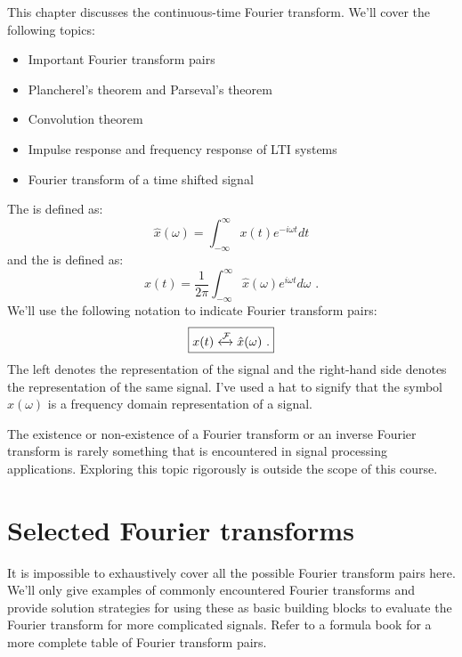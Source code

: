 This chapter discusses the continuous-time Fourier transform. We'll cover the following topics:
\begin{itemize}
    \item Important Fourier transform pairs
    \item Plancherel's theorem and Parseval's theorem
    \item Convolution theorem
    \item Impulse response and frequency response of LTI systems
    \item Fourier transform of a time shifted signal
\end{itemize}

\noindent The \emph{} is defined as:
\begin{equation}
    \boxed{
        \hat{x}(\omega) = \int_{-\infty}^{\infty} x(t) e^{-i\omega t}dt}
\end{equation}
and the \emph{} is defined as:
\begin{equation}
    \boxed{
        x(t) = \frac{1}{2\pi}\int_{-\infty}^{\infty} \hat{x}(\omega) e^{i\omega t}d\omega\,\,.
    }
\end{equation}
We'll use the following notation to indicate Fourier transform pairs:
\begin{equation}
    \boxed{x(t) \xleftrightarrow{\mathcal{F}} \hat{x}(\omega)\,\,.}
\end{equation}
The left denotes the \emph{} representation of the 
signal and the right-hand side denotes the \emph{} 
representation of the same signal. I've used a hat to signify that 
the symbol $\hat{x}(\omega)$ is a frequency domain representation of a signal.

The existence or non-existence of a Fourier transform or an inverse Fourier transform 
is rarely something that is encountered in signal processing applications. 
Exploring this topic rigorously is outside the scope of this course.

\section{Selected Fourier transforms}
It is impossible to exhaustively cover all the possible Fourier transform pairs here. 
We'll only give examples of commonly encountered Fourier transforms and provide solution 
strategies for using these as basic building blocks to evaluate the Fourier 
transform for more complicated signals. 
Refer to a formula book\cite{kammler2007first} 
for a more complete table of Fourier transform pairs.

